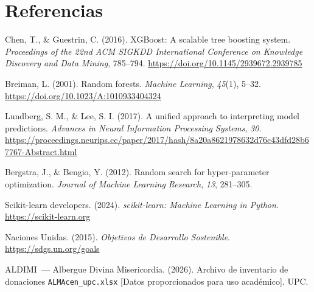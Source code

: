 \documentclass[12pt, a4paper]{article}
\begin{document}
\section*{Referencias}

\begin{enumerate}[leftmargin=2em, itemsep=5pt, label={[\arabic*]}]

  \item Chen, T., \& Guestrin, C. (2016).
    XGBoost: A scalable tree boosting system.
    \textit{Proceedings of the 22nd ACM SIGKDD International Conference on Knowledge Discovery and Data Mining}, 785--794.
    \url{https://doi.org/10.1145/2939672.2939785}

  \item Breiman, L. (2001).
    Random forests.
    \textit{Machine Learning}, \textit{45}(1), 5--32.
    \url{https://doi.org/10.1023/A:1010933404324}

  \item Lundberg, S. M., \& Lee, S. I. (2017).
    A unified approach to interpreting model predictions.
    \textit{Advances in Neural Information Processing Systems}, \textit{30}.
    \url{https://proceedings.neurips.cc/paper/2017/hash/8a20a8621978632d76c43dfd28b67767-Abstract.html}

  \item Bergstra, J., \& Bengio, Y. (2012).
    Random search for hyper-parameter optimization.
    \textit{Journal of Machine Learning Research}, \textit{13}, 281--305.

  \item Scikit-learn developers. (2024).
    \textit{scikit-learn: Machine Learning in Python}.
    \url{https://scikit-learn.org}

  \item Naciones Unidas. (2015).
    \textit{Objetivos de Desarrollo Sostenible}.
    \url{https://sdgs.un.org/goals}

  \item ALDIMI\ --- Albergue Divina Misericordia. (2026).
    Archivo de inventario de donaciones \texttt{ALMAcen\_upc.xlsx}
    [Datos proporcionados para uso acad\'emico]. UPC.

\end{enumerate}
\end{document}

